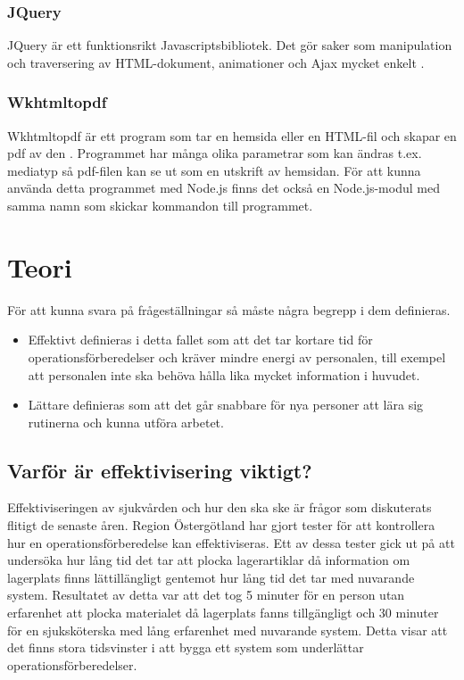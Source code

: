 \documentclass{article}
\begin{document}
\subsubsection{JQuery}
JQuery är ett funktionsrikt Javascriptsbibliotek. Det gör saker som manipulation och traversering av HTML-dokument, animationer och Ajax mycket enkelt \cite{jquery}.

\subsubsection{Wkhtmltopdf}
Wkhtmltopdf är ett program som tar en hemsida eller en HTML-fil och skapar en pdf av den \cite{wkhtmltopdf}. Programmet har många olika parametrar som kan ändras t.ex. mediatyp så pdf-filen kan se ut som en utskrift av hemsidan. För att kunna använda detta programmet med Node.js finns det också en Node.js-modul med samma namn som skickar kommandon till programmet.


\section{Teori}

För att kunna svara på frågeställningar så måste några begrepp i dem definieras.
\begin{itemize}
\item Effektivt definieras i detta fallet som att det tar kortare tid för operationsförberedelser och kräver mindre energi av personalen, till exempel att personalen inte ska behöva hålla lika mycket information i huvudet. 
\item Lättare definieras som att det går snabbare för nya personer att lära sig rutinerna och kunna utföra arbetet.
\end{itemize}

\subsection{Varför är effektivisering viktigt?}
Effektiviseringen av sjukvården och hur den ska ske är frågor som diskuterats flitigt de senaste åren. Region Östergötland har gjort tester för att kontrollera hur en operationsförberedelse kan effektiviseras. Ett av dessa tester gick ut på att undersöka hur lång tid det tar att plocka lagerartiklar då information om lagerplats finns lättillängligt gentemot hur lång tid det tar med nuvarande system. Resultatet av detta var att det tog 5 minuter för en person utan erfarenhet att plocka materialet då lagerplats fanns tillgängligt och 30 minuter för en sjuksköterska med lång erfarenhet med nuvarande system. Detta visar att det finns stora tidsvinster i att bygga ett system som underlättar operationsförberedelser.
\end{document}
